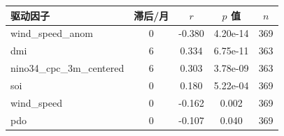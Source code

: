 \begin{tabular}{lcccc}
\hline
驱动因子 & 滞后/月 & $r$ & $p$ 值 & $n$ \\
\hline
wind\_speed\_anom & 0 & -0.380 & 4.20e-14 & 369 \\
dmi & 6 & 0.334 & 6.75e-11 & 363 \\
nino34\_cpc\_3m\_centered & 6 & 0.303 & 3.78e-09 & 363 \\
soi & 0 & 0.180 & 5.22e-04 & 369 \\
wind\_speed & 0 & -0.162 & 0.002 & 369 \\
pdo & 0 & -0.107 & 0.040 & 369 \\
\hline
\end{tabular}
